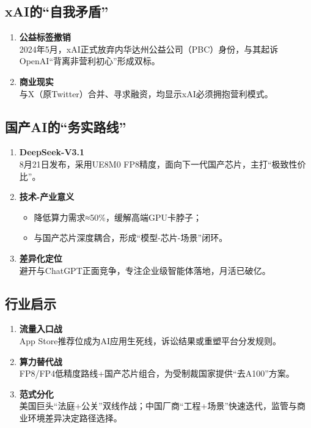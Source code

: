 \subsection{xAI的“自我矛盾”}
\begin{enumerate}[leftmargin=*, nosep]
    \item \textbf{公益标签撤销}  \\
    2024年5月，xAI正式放弃内华达州公益公司（PBC）身份，与其起诉OpenAI“背离非营利初心”形成双标。
    \item \textbf{商业现实}  \\
    与X（原Twitter）合并、寻求融资，均显示xAI必须拥抱营利模式。
\end{enumerate}

\subsection{国产AI的“务实路线”}
\begin{enumerate}[leftmargin=*, nosep]
    \item \textbf{DeepSeek-V3.1}  \\
    8月21日发布，采用UE8M0 FP8精度，面向下一代国产芯片，主打“极致性价比”。
    \item \textbf{技术-产业意义}  \\
    \begin{itemize}[nosep]
        \item 降低算力需求≈50\%，缓解高端GPU卡脖子；  
        \item 与国产芯片深度耦合，形成“模型-芯片-场景”闭环。
    \end{itemize}
    \item \textbf{差异化定位}  \\
    避开与ChatGPT正面竞争，专注企业级智能体落地，月活已破亿。
\end{enumerate}

\subsection{行业启示}
\begin{enumerate}[leftmargin=*, nosep]
    \item \textbf{流量入口战}  \\
    App Store推荐位成为AI应用生死线，诉讼结果或重塑平台分发规则。
    \item \textbf{算力替代战}  \\
    FP8/FP4低精度路线+国产芯片组合，为受制裁国家提供“去A100”方案。
    \item \textbf{范式分化}  \\
    美国巨头“法庭+公关”双线作战；中国厂商“工程+场景”快速迭代，监管与商业环境差异决定路径选择。
\end{enumerate}

